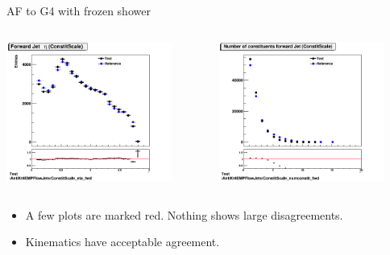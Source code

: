 \begin{frame}{AF to G4 with frozen shower}
    \begin{columns}
        \begin{column}{0.5\textwidth}
            \includegraphics[width=0.85\textwidth]{2r_eta_constit}
        \end{column}
        \begin{column}{0.5\textwidth}
            \includegraphics[width=0.85\textwidth]{2r_numconstit_constit}
        \end{column}
    \end{columns}
    \begin{itemize}
        \item A few plots are marked red. Nothing shows large disagreements.
        \item Kinematics have acceptable agreement.
    \end{itemize}
\end{frame}